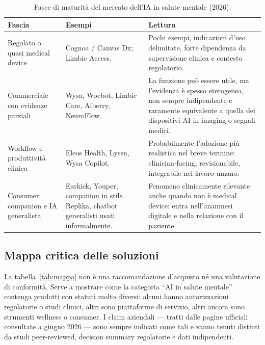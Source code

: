 \documentclass[11pt,a4paper]{article}
\begin{document}
\begin{table}[htbp]
\centering\small
\caption{Fasce di maturità del mercato dell'IA in salute mentale (2026).}
\label{tab:velocita}
\begin{tabularx}{\textwidth}{>{\RaggedRight}p{3.0cm} >{\RaggedRight}p{3.6cm} Y}
\toprule
\textbf{Fascia} & \textbf{Esempi} & \textbf{Lettura} \\
\midrule
Regolato o quasi medical device & Cognoa / Canvas Dx; Limbic Access. & Pochi esempi, indicazioni d'uso delimitate, forte dipendenza da supervisione clinica e contesto regolatorio. \\
\addlinespace
Commerciale con evidenze parziali & Wysa, Woebot, Limbic Care, Aiberry, NeuroFlow. & La funzione può essere utile, ma l'evidenza è spesso eterogenea, non sempre indipendente e raramente equivalente a quella dei dispositivi AI in imaging o segnali medici. \\
\addlinespace
Workflow e produttività clinica & Eleos Health, Lyssn, Wysa Copilot. & Probabilmente l'adozione più realistica nel breve termine: clinician-facing, revisionabile, integrabile nel lavoro umano. \\
\addlinespace
Consumer companion e IA generalista & Earkick, Youper, companion in stile Replika, chatbot generalisti usati informalmente. & Fenomeno clinicamente rilevante anche quando non è medical device: entra nell'anamnesi digitale e nella relazione con il paziente. \\
\bottomrule
\end{tabularx}
\end{table}

\subsection{Mappa critica delle soluzioni}

La tabella~\ref{tab:mappa} non è una raccomandazione d'acquisto né una valutazione di conformità. Serve a mostrare come la categoria ``AI in salute mentale'' contenga prodotti con statuti molto diversi: alcuni hanno autorizzazioni regolatorie o studi clinici, altri sono piattaforme di servizio, altri ancora sono strumenti wellness o consumer. I claim aziendali --- tratti dalle pagine ufficiali consultate a giugno 2026 --- sono sempre indicati come tali e vanno tenuti distinti da studi peer-reviewed, decision summary regolatorie e dati indipendenti.
\end{document}
